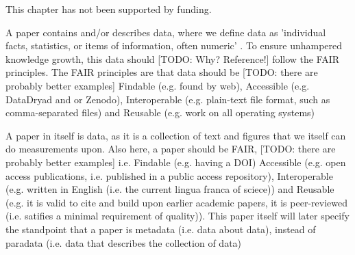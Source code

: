 This chapter has not been supported by funding.
















A paper contains and/or describes data, where we define
data as 'individual facts, statistics, or items of information, often 
numeric' \cite{glossary2003oecd}.
To ensure unhampered knowledge growth, this data should [TODO: Why? Reference!] 
follow the FAIR 
principles.
The FAIR principles \cite{wilkinson2016fair} are that data should be 
[TODO: there are probably better examples]
Findable (e.g. found by web),
Accessible (e.g. DataDryad and or Zenodo), 
Interoperable (e.g. plain-text file format, such as comma-separated files) 
and Reusable (e.g. work on all operating systems)


A paper in itself is data, as it is a collection of text and
figures that we itself can do measurements upon.
Also here, a paper should be FAIR, 
[TODO: there are probably better examples]
i.e.
Findable (e.g. having a DOI)
Accessible (e.g. open access publications, i.e. published in a public access
repository), 
Interoperable (e.g. written in English (i.e. the current lingua franca of sciece))
and Reusable (e.g. it is valid to cite and build upon earlier academic papers, 
it is peer-reviewed (i.e. satifies a minimal requirement of quality)).
This paper itself will later specify the standpoint that a paper
is metadata (i.e. data about data), instead of paradata (i.e.
data that describes the collection of data)

